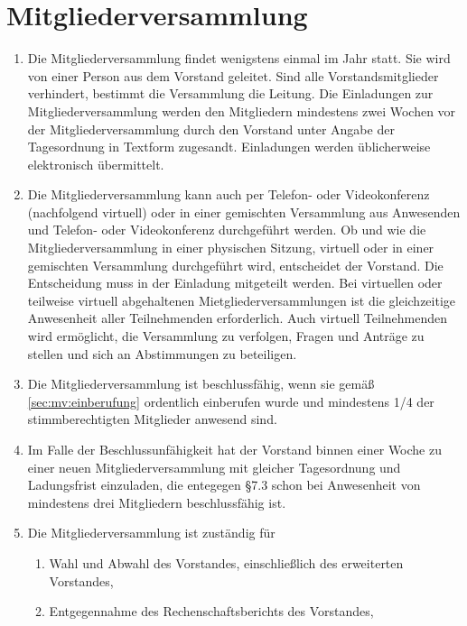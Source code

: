 \documentclass[12pt,paper=a4,ngerman]{scrreprt}
\begin{document}
	\section{Mitgliederversammlung}
	\begin{enumerate}
	    \item
	        \label{sec:mv:einberufung}
	        Die Mitgliederversammlung findet wenigstens einmal im Jahr statt. Sie wird von einer Person aus dem Vorstand geleitet. Sind alle Vorstandsmitglieder verhindert, bestimmt die Versammlung die Leitung. Die Einladungen zur Mitgliederversammlung werden den Mitgliedern mindestens zwei Wochen vor der Mitgliederversammlung durch den Vorstand unter Angabe der Tagesordnung in Textform zugesandt. Einladungen werden üblicherweise elektronisch übermittelt.
        \item
			Die Mitgliederversammlung kann auch per Telefon- oder Videokonferenz (nachfolgend \glqq{}virtuell\grqq{}) oder in einer gemischten Versammlung aus Anwesenden und Telefon- oder Videokonferenz durchgeführt werden. Ob und wie die Mitgliederversammlung in einer physischen Sitzung, virtuell oder in einer gemischten Versammlung durchgeführt wird, entscheidet der Vorstand. Die Entscheidung muss in der Einladung mitgeteilt werden.
			Bei virtuellen oder teilweise virtuell abgehaltenen Mietgliederversammlungen ist die gleichzeitige Anwesenheit aller Teilnehmenden erforderlich. Auch virtuell Teilnehmenden wird ermöglicht, die Versammlung zu verfolgen, Fragen und Anträge zu stellen und sich an Abstimmungen zu beteiligen.
        \item
            Die Mitgliederversammlung ist beschlussfähig, wenn sie gemäß \ref{sec:mv:einberufung} ordentlich einberufen wurde und mindestens 1/4 der stimmberechtigten Mitglieder anwesend sind.
        \item
            Im Falle der Beschlussunfähigkeit hat der Vorstand binnen einer Woche zu einer neuen Mitgliederversammlung mit gleicher Tagesordnung und Ladungsfrist einzuladen, die entegegen §7.3 schon bei Anwesenheit von mindestens drei Mitgliedern beschlussfähig ist.
        \item
            Die Mitgliederversammlung ist zuständig für
            \begin{enumerate}
                \item
                    Wahl und Abwahl des Vorstandes, einschließlich des erweiterten Vorstandes,
                \item
                    Entgegennahme des Rechenschaftsberichts des Vorstandes,

\end{enumerate}
\end{enumerate}
\end{document}
